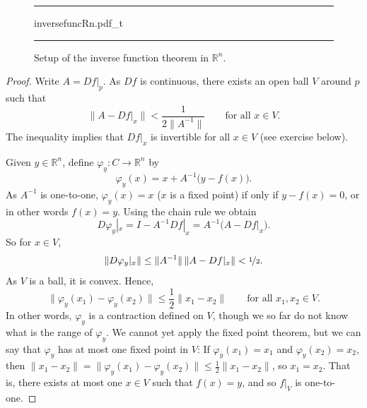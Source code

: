 \documentclass[12pt,openany]{book}
\newcommand{\snorm}[1]{\lVert {#1} \rVert}
\newcommand{\R}{{\mathbb{R}}}
\theoremstyle{plain}
\theoremstyle{remark}
\theoremstyle{definition}
\newenvironment{myfig}{%
\begin{figure}[h!t]
\noindent\rule{\textwidth}{0.5pt}\vspace{12pt}\par\centering}%
{\par\noindent\rule{\textwidth}{0.5pt}
\end{figure}}
\theoremstyle{exercise}
\theoremstyle{example}
\begin{document}
\begin{myfig}
{inversefuncRn.pdf_t}
\caption{Setup of the inverse function theorem in $\R^n$.\label{fig:inversefuncRn}}
\end{myfig}

\begin{proof}
Write $A = Df|_p$.  As $Df$ is continuous, there exists an open ball
$V$ around $p$ such that
\begin{equation*}
\snorm{A-Df|_x} < \frac{1}{2\snorm{A^{-1}}}
\qquad \text{for all } x \in V.
\end{equation*}
The inequality implies that $Df|_x$ is invertible for all $x \in V$
(see exercise below).

Given $y \in \R^n$, define $\varphi_y \colon C \to \R^n$ by
\begin{equation*}
\varphi_y (x) = x + A^{-1}\bigl(y-f(x)\bigr) .
\end{equation*}
As $A^{-1}$ is one-to-one,
$\varphi_y(x) = x$ ($x$ is a fixed point) if only if
$y-f(x) = 0$, or in other words $f(x)=y$.  Using the chain rule we obtain
\begin{equation*}
D\varphi_y|_x = I - A^{-1} Df|_x = A^{-1} \bigl( A-Df|_x \bigr) .
\end{equation*}
So for $x \in V$,
\begin{equation*}
\snorm{D\varphi_y|_x} \leq \snorm{A^{-1}} \, \snorm{A-Df|_x} < \nicefrac{1}{2} .
\end{equation*}
As $V$ is a ball, it is convex.  Hence,
\begin{equation*}
\snorm{\varphi_y(x_1)-\varphi_y(x_2)} \leq \frac{1}{2} \snorm{x_1-x_2} 
\qquad
\text{for all } x_1,x_2 \in V.
\end{equation*}
In other words, $\varphi_y$ is a contraction defined on $V$, though we so far
do not know what is the range of $\varphi_y$.  We cannot yet
apply the fixed
point theorem, but we can say that $\varphi_y$ 
has at most one fixed point in $V$:
If $\varphi_y(x_1) = x_1$ and
$\varphi_y(x_2) = x_2$, then
$\snorm{x_1-x_2} = \snorm{\varphi_y(x_1)-\varphi_y(x_2)} \leq
\frac{1}{2} \snorm{x_1-x_2}$, so $x_1 = x_2$.
That is, there exists at most one $x \in V$
such that $f(x) = y$, and so $f|_V$ is one-to-one.


\end{proof}
\end{document}
